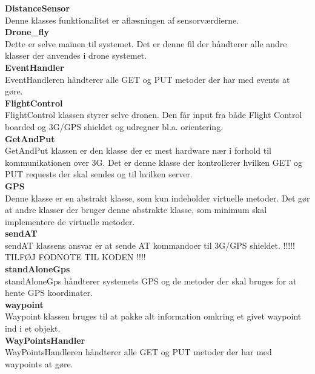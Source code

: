 \textbf{DistanceSensor}\\
Denne klasses funktionalitet er aflæsningen af sensorværdierne. \\ 

\textbf{Drone\_fly}\\
Dette er selve mainen til systemet. Det er denne fil der håndterer alle andre klasser der anvendes i drone systemet. \\ 

\textbf{EventHandler}\\
EventHandleren håndterer alle GET og PUT metoder der har med events at gøre. \\ 

\textbf{FlightControl}\\
FlightControl klassen styrer selve dronen. Den får input fra både Flight Control boarded og 3G/GPS shieldet og udregner bl.a. orientering. \\

\textbf{GetAndPut}\\
GetAndPut klassen er den klasse der er mest hardware nær i forhold til kommunikationen over 3G. Det er denne klasse der kontrollerer hvilken GET og PUT requests der skal sendes og til hvilken server. \\ 

\textbf{GPS}\\
Denne klasse er en abstrakt klasse, som kun indeholder virtuelle metoder. Det gør at andre klasser der bruger denne abstrakte klasse, som minimum skal implementere de virtuelle metoder. \\ 

\textbf{sendAT}\\
sendAT klassens ansvar er at sende AT kommandoer til 3G/GPS shieldet. !!!!! TILFØJ FODNOTE TIL KODEN !!!!\\ 

\textbf{standAloneGps}\\
standAloneGps håndterer systemets GPS og de metoder der skal bruges for at hente GPS koordinater. \\ 

\textbf{waypoint}\\
Waypoint klassen bruges til at pakke alt information omkring et givet waypoint ind i et objekt.\\ 

\textbf{WayPointsHandler}\\
WayPointsHandleren håndterer alle GET og PUT metoder der har med waypoints at gøre. \\ 

